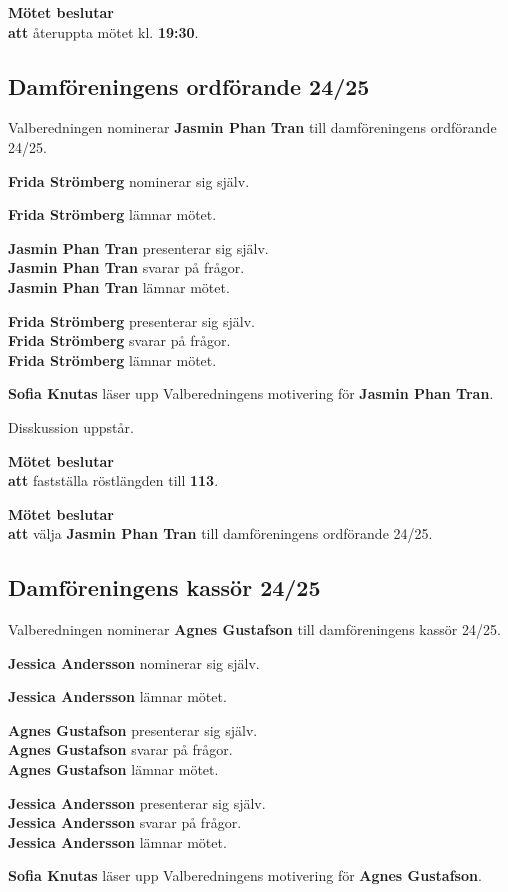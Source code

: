 \documentclass{datateknologsektionen-document}
\newcommand{\ind}{\hspace*{2em}}
\newcommand{\motetbeslutar}{\textbf{Mötet beslutar}}
\newcommand{\att}{\\\ind\textbf{att}}
\newcommand{\rostlangd}[1]{\motetbeslutar\att{} fastställa röstlängden till \textbf{#1}.}
\begin{document}
\motetbeslutar\att{} återuppta mötet kl. \textbf{19:30}.

\subsection{Damföreningens ordförande 24/25}

Valberedningen nominerar \textbf{Jasmin Phan Tran} till damföreningens ordförande 24/25.

\textbf{Frida Strömberg} nominerar sig själv.

\textbf{Frida Strömberg} lämnar mötet.

\textbf{Jasmin Phan Tran} presenterar sig själv.\\
\textbf{Jasmin Phan Tran} svarar på frågor.\\
\textbf{Jasmin Phan Tran} lämnar mötet.

\textbf{Frida Strömberg} presenterar sig själv.\\
\textbf{Frida Strömberg} svarar på frågor.\\
\textbf{Frida Strömberg} lämnar mötet.

\textbf{Sofia Knutas} läser upp Valberedningens motivering för \textbf{Jasmin Phan Tran}.

Disskussion uppstår.

\rostlangd{113}

\motetbeslutar\att{} välja \textbf{Jasmin Phan Tran} till damföreningens ordförande 24/25.

\subsection{Damföreningens kassör 24/25}

Valberedningen nominerar \textbf{Agnes Gustafson} till damföreningens kassör 24/25.

\textbf{Jessica Andersson} nominerar sig själv.

\textbf{Jessica Andersson} lämnar mötet.

\textbf{Agnes Gustafson} presenterar sig själv.\\
\textbf{Agnes Gustafson} svarar på frågor.\\
\textbf{Agnes Gustafson} lämnar mötet.

\textbf{Jessica Andersson} presenterar sig själv.\\
\textbf{Jessica Andersson} svarar på frågor.\\
\textbf{Jessica Andersson} lämnar mötet.

\textbf{Sofia Knutas} läser upp Valberedningens motivering för \textbf{Agnes Gustafson}.
\end{document}

